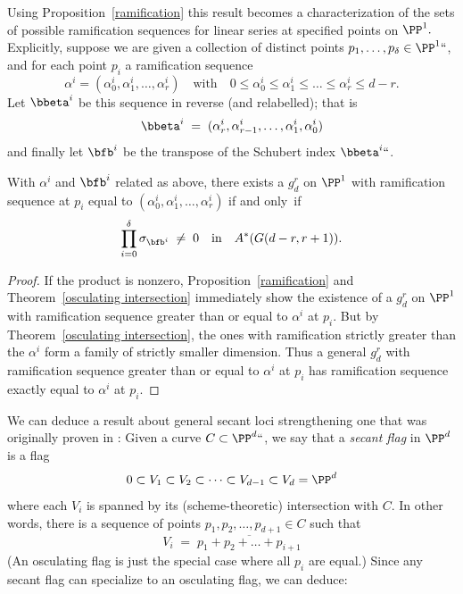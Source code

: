 Using Proposition~\ref{ramification} this result becomes a
characterization of the sets of possible ramification
sequences for linear series at specified points on $\PP^1.$
 Explicitly, suppose we are given a collection of distinct points
 $p_1,\dots,p_\delta \in \PP^1` `$, and for each point $p_i$ a
 ramification sequence
$$
\alpha^i = (\alpha^i_0, \alpha^i_1, \dots, \alpha^i_r) \quad \text{with}
\quad 0 \leq \alpha^i_0 \leq \alpha^i_1 \leq \dots \leq \alpha^i_r
\leq d-r.
$$
Let ${\bbeta}^i$ be this sequence in reverse (and relabelled); that is
$$
{\bbeta}^i \; = \; (\alpha^i_r, \alpha^i_{r-1}, \dots, \alpha^i_1,
\alpha^i_0)
$$
and finally let $\bfb^i$ be the transpose of the Schubert index
${\bbeta}^i` `$.

\begin{corollary}
With $\alpha^i $ and $\bfb^i$ related as above,  there exists a
$g^r_d$ on $\PP^1$ with ramification sequence at $p_i$ equal to
$(\alpha^i_0, \alpha^i_1, \dots, \alpha^i_r)$ if and only~if
$$
\prod_{i=0}^\delta  \sigma_{\bfb^i} \; \neq \; 0 \quad \text{in} \quad
A^*(G(d-r, r+1)).
$$
\end{corollary}

\begin{proof}
If the product is nonzero, Proposition~\ref{ramification} and
Theorem~\ref{osculating intersection} immediately show the existence of
a $g^r_d$ on $\PP^1$ with ramification sequence greater than or equal
to $\alpha^i$ at $p_i$. But by Theorem~\ref{osculating intersection},
the ones with ramification strictly greater than the $\alpha^i$ form
a family of strictly smaller dimension. Thus a general $g^r_d$ with
ramification sequence greater than or equal to $\alpha^i$ at $p_i$
has  ramification sequence exactly equal to $\alpha^i$ at $p_i$.
\end{proof}

We can deduce a result about general secant loci
%
strengthening one that
was originally proven in \cite{Griffiths-Harris-BN}:
Given a curve $C \subset \PP^d` `$, we say that a \emph{secant flag}
in $\PP^d$ is a flag
$$
0 \subset V_1 \subset V_2 \subset \dots \subset V_{d-1} \subset V_d
= \PP^d
$$
where each $V_i$ is spanned by its (scheme-theoretic) intersection with
$C$. In other words, there is a sequence of points $p_1, p_2, \dots,
p_{d+1} \in C$ such that
$$
V_i \; = \; \overline{p_1+p_2+ \dots + p_{i+1}}
$$
(An osculating flag is just the special case where all $p_i$ are
equal.) Since any secant flag can specialize to an osculating flag,
we can deduce:

